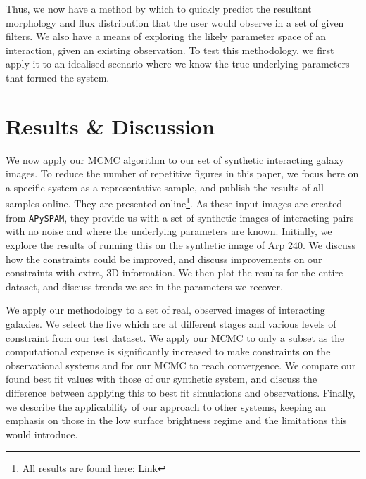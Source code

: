 Thus, we now have a method by which to quickly predict the resultant morphology and flux distribution that the user would observe in a set of given filters. We also have a means of exploring the likely parameter space of an interaction, given an existing observation. To test this methodology, we first apply it to an idealised scenario where we know the true underlying parameters that formed the system.


\section{Results \& Discussion}\label{Results}
\noindent We now apply our MCMC algorithm to our set of synthetic interacting galaxy images. To reduce the number of repetitive figures in this paper, we focus here on a specific system as a representative sample, and publish the results of all samples online. They are presented online\footnote{All results are found here: \href{https://drive.google.com/drive/folders/1hlFhrdoZ50JaEWWYoy0RZ3J4LSoRjmsq?usp=sharing}{Link}}. As these input images are created from \texttt{APySPAM}, they provide us with a set of synthetic images of interacting pairs with no noise and where the underlying parameters are known. Initially, we explore the results of running this on the synthetic image of Arp 240. We discuss how the constraints could be improved, and discuss improvements on our constraints with extra, 3D information. We then plot the results for the entire dataset, and discuss trends we see in the parameters we recover.

We apply our methodology to a set of real, observed images of interacting galaxies. We select the five which are at different stages and various levels of constraint from our test dataset. We apply our MCMC to only a subset as the computational expense is significantly increased to make constraints on the observational systems and for our MCMC to reach convergence. We compare our found best fit values with those of our synthetic system, and discuss the difference between applying this to best fit simulations and observations. Finally, we describe the applicability of our approach to other systems, keeping an emphasis on those in the low surface brightness regime and the limitations this would introduce.

